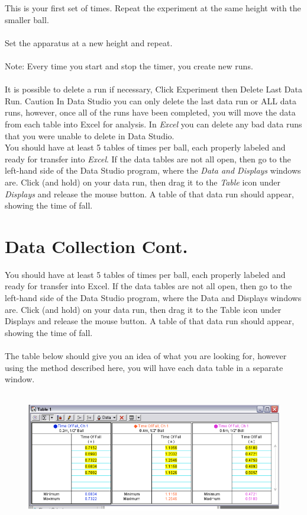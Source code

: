   This is your first set of times. Repeat the experiment at the same height with the smaller ball.\\\\
  Set the apparatus at a new height and repeat.\\\\
  Note: Every time you start and stop the timer, you create new runs.\\\\
  It is possible to delete a run if necessary, Click Experiment then Delete Last
  Data Run. Caution\: In Data Studio you can only delete the last data run or ALL 
  data runs, however, once all of the runs have been completed, you will move the 
  data from each table into Excel for analysis. In \emph{Excel} you can delete any bad data 
  runs that you were unable to delete in Data Studio.\\


  You should have at least 5 tables of times per ball, each properly labeled 
  and ready for transfer into \emph{Excel}. If the data tables are not all open, then 
  go to the left-hand side of the Data Studio program, where the \emph{Data and 
  Displays} windows are. Click (and hold) on your data run, then drag it to the 
  \emph{Table} icon under \emph{Displays} and release the mouse button. A table of that data 
  run should appear, showing the time of fall.

  \section{Data Collection Cont.}

  You should have at least 5 tables of times per ball, each properly labeled and
ready for transfer into Excel. If the data tables are not all open, then go to the
left-hand side of the Data Studio program, where the Data and Displays
windows are. Click (and hold) on your data run, then drag it to the Table icon
under Displays and release the mouse button. A table of that data run should
appear, showing the time of fall.\\\\
The table below should give you an idea of what you are looking for, however
using the method described here, you will have each data table in a separate
window.\\\\

\begin{figure}[bh!]
  \centerline{\includegraphics[scale=0.45]{resources/photo9.png}}
\end{figure}

